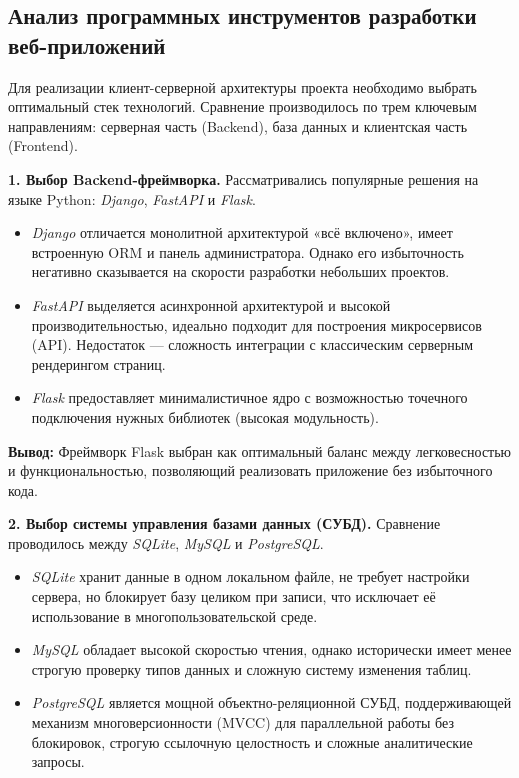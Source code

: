 \subsection{Анализ программных инструментов разработки веб-приложений}

Для реализации клиент-серверной архитектуры проекта необходимо выбрать оптимальный стек технологий. Сравнение производилось по трем ключевым направлениям: серверная часть (Backend), база данных и клиентская часть (Frontend).

\textbf{1. Выбор Backend-фреймворка.} Рассматривались популярные решения на языке Python: \textit{Django}, \textit{FastAPI} и \textit{Flask}.
\begin{itemize}
    \item \textit{Django} отличается монолитной архитектурой «всё включено», имеет встроенную ORM и панель администратора. Однако его избыточность негативно сказывается на скорости разработки небольших проектов.
    \item \textit{FastAPI} выделяется асинхронной архитектурой и высокой производительностью, идеально подходит для построения микросервисов (API). Недостаток — сложность интеграции с классическим серверным рендерингом страниц.
    \item \textit{Flask} \cite{flask_doc} предоставляет минималистичное ядро с возможностью точечного подключения нужных библиотек (высокая модульность).
\end{itemize}

\textbf{Вывод:} Фреймворк Flask выбран как оптимальный баланс между легковесностью и функциональностью, позволяющий реализовать приложение без избыточного кода.

\textbf{2. Выбор системы управления базами данных (СУБД).} Сравнение проводилось между \textit{SQLite}, \textit{MySQL} и \textit{PostgreSQL}.
\begin{itemize}
    \item \textit{SQLite} хранит данные в одном локальном файле, не требует настройки сервера, но блокирует базу целиком при записи, что исключает её использование в многопользовательской среде.
    \item \textit{MySQL} обладает высокой скоростью чтения, однако исторически имеет менее строгую проверку типов данных и сложную систему изменения таблиц.
    \item \textit{PostgreSQL} является мощной объектно-реляционной СУБД, поддерживающей механизм многоверсионности (MVCC) для параллельной работы без блокировок, строгую ссылочную целостность и сложные аналитические запросы.
\end{itemize}

